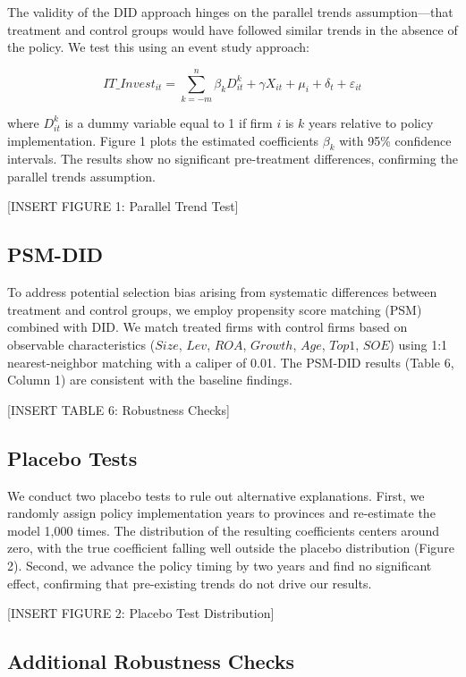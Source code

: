 \documentclass[12pt]{article}
\begin{document}
The validity of the DID approach hinges on the parallel trends assumption—that treatment and control groups would have followed similar trends in the absence of the policy. We test this using an event study approach:

\begin{equation}
IT\_Invest_{it} = \sum_{k=-m}^{n} \beta_k D_{it}^k + \gamma X_{it} + \mu_i + \delta_t + \varepsilon_{it}
\end{equation}

where $D_{it}^k$ is a dummy variable equal to 1 if firm $i$ is $k$ years relative to policy implementation. Figure 1 plots the estimated coefficients $\beta_k$ with 95\% confidence intervals. The results show no significant pre-treatment differences, confirming the parallel trends assumption.

[INSERT FIGURE 1: Parallel Trend Test]

\subsection{PSM-DID}

To address potential selection bias arising from systematic differences between treatment and control groups, we employ propensity score matching (PSM) combined with DID. We match treated firms with control firms based on observable characteristics ($Size$, $Lev$, $ROA$, $Growth$, $Age$, $Top1$, $SOE$) using 1:1 nearest-neighbor matching with a caliper of 0.01. The PSM-DID results (Table 6, Column 1) are consistent with the baseline findings.

[INSERT TABLE 6: Robustness Checks]

\subsection{Placebo Tests}

We conduct two placebo tests to rule out alternative explanations. First, we randomly assign policy implementation years to provinces and re-estimate the model 1,000 times. The distribution of the resulting coefficients centers around zero, with the true coefficient falling well outside the placebo distribution (Figure 2). Second, we advance the policy timing by two years and find no significant effect, confirming that pre-existing trends do not drive our results.

[INSERT FIGURE 2: Placebo Test Distribution]

\subsection{Additional Robustness Checks}
\end{document}
